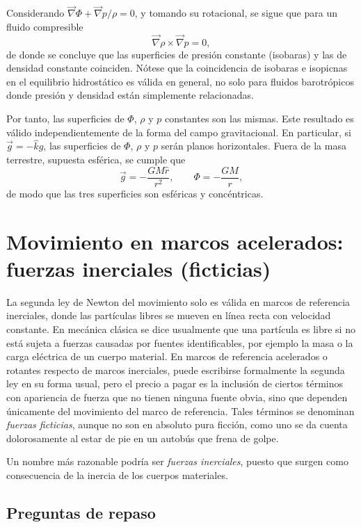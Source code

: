 Considerando $\vec{\nabla}\Phi + \vec{\nabla}p/\rho = 0$, y tomando su rotacional, se sigue que para un fluido compresible
$$ \vec{\nabla}\rho\times\vec{\nabla}p = 0, $$
de donde se concluye que las superficies de presión constante (isobaras) y las de densidad constante coinciden. Nótese que la coincidencia de isobaras e isopicnas en el equilibrio hidrostático es válida en general, no solo para fluidos barotrópicos donde presión y densidad están simplemente relacionadas.

Por tanto, las superficies de $\Phi$, $\rho$ y $p$ constantes son las mismas. Este resultado es válido independientemente de la forma del campo gravitacional. En particular, si $\vec{g} = -\hat{k}g$, las superficies de $\Phi$, $\rho$ y $p$ serán planos horizontales. Fuera de la masa terrestre, supuesta esférica, se cumple que
$$ \vec{g} = -\frac{GM\hat{r}}{r^2}, \qquad \Phi = -\frac{GM}{r}, $$
de modo que las tres superficies son esféricas y concéntricas.

\section{Movimiento en marcos acelerados: fuerzas inerciales (ficticias)}

La segunda ley de Newton del movimiento solo es válida en marcos de referencia inerciales, donde las partículas libres se mueven en línea recta con velocidad constante. En mecánica clásica se dice usualmente que una partícula es libre si no está sujeta a fuerzas causadas por fuentes identificables, por ejemplo la masa o la carga eléctrica de un cuerpo material. En marcos de referencia acelerados o rotantes respecto de marcos inerciales, puede escribirse formalmente la segunda ley en su forma usual, pero el precio a pagar es la inclusión de ciertos términos con apariencia de fuerza que no tienen ninguna fuente obvia, sino que dependen únicamente del movimiento del marco de referencia. Tales términos se denominan \emph{fuerzas ficticias}, aunque no son en absoluto pura ficción, como uno se da cuenta dolorosamente al estar de pie en un autobús que frena de golpe.

Un nombre más razonable podría ser \emph{fuerzas inerciales}, puesto que surgen como consecuencia de la inercia de los cuerpos materiales.

\subsection{Preguntas de repaso}

